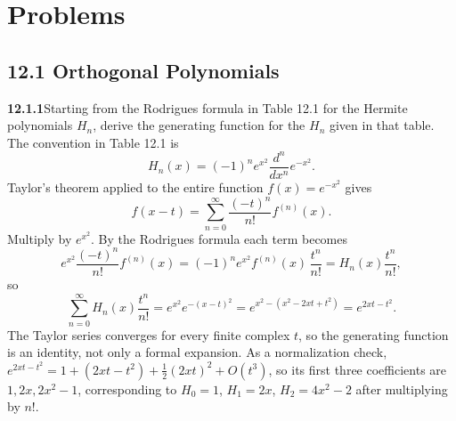
\section*{Problems}

\subsection*{12.1 Orthogonal Polynomials}

\par\bigskip
\noindent\textbf{12.1.1}\quad Starting from the Rodrigues formula in
Table 12.1 for the Hermite polynomials $H_{n}$, derive the generating
function for the $H_{n}$ given in that table.
\solution
The convention in Table 12.1 is
\[
H_n(x)=(-1)^ne^{x^2}\frac{d^n}{dx^n}e^{-x^2}.
\]
Taylor's theorem applied to the entire function $f(x)=e^{-x^2}$ gives
\[
f(x-t)=\sum_{n=0}^{\infty}\frac{(-t)^n}{n!}f^{(n)}(x).
\]
Multiply by $e^{x^2}$. By the Rodrigues formula each term becomes
\[
e^{x^2}\frac{(-t)^n}{n!}f^{(n)}(x)
=(-1)^ne^{x^2}f^{(n)}(x)\,\frac{t^n}{n!}=H_n(x)\frac{t^n}{n!},
\]
so
\[
\sum_{n=0}^{\infty}H_n(x)\frac{t^n}{n!}
=e^{x^2}e^{-(x-t)^2}
=e^{x^2-(x^2-2xt+t^2)}
=\boxed{e^{2xt-t^2}}.
\]
The Taylor series converges for every finite complex $t$, so the generating
function is an identity, not only a formal expansion. As a normalization
check, $e^{2xt-t^2}=1+(2xt-t^2)+\frac12(2xt)^2+O(t^3)$, so its first three
coefficients are $1,2x,2x^2-1$, corresponding to
$H_0=1$, $H_1=2x$, $H_2=4x^2-2$ after multiplying by $n!$.

